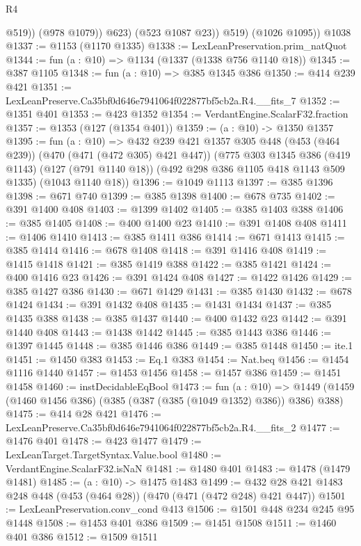 \begin{lexlean}{R4}
\begin{coremodule}
                  @519))
              (@978 @1079))
            @623)
          (@523 @1087 @23))
        @519)
      (@1026 @1095))
    @1038
@1337 := @1153 (@1170 @1335)
@1338 := LexLeanPreservation.prim_natQuot
@1344 := fun (a : @10) => @1134 (@1337 (@1338 @756 @1140 @18))
@1345 := @387 @1105
@1348 := fun (a : @10) => @385 @1345 @386
@1350 := @414 @239 @421
@1351 := LexLeanPreserve.Ca35bf0d646e7941064f022877bf5cb2a.R4.__fits_7
@1352 := @1351 @401
@1353 := @423 @1352
@1354 := VerdantEngine.ScalarF32.fraction
@1357 := @1353 (@127 (@1354 @401))
@1359 := (a : @10) -> @1350 @1357
@1395 := fun (a : @10) =>
  @432
    @239
    @421
    @1357
    @305
    @448
    (@453 (@464 @239))
    (@470 (@471 (@472 @305) @421 @447))
    (@775
      @303
      @1345
      @386
      (@419 @1143)
      (@127 (@791 @1140 @18))
      (@492 @298 @386 @1105 @418 @1143 @509 @1335)
      (@1043 @1140 @18))
@1396 := @1049 @1113
@1397 := @385 @1396
@1398 := @671 @740
@1399 := @385 @1398
@1400 := @678 @735
@1402 := @391 @1400 @408
@1403 := @1399 @1402
@1405 := @385 @1403 @388
@1406 := @385 @1405
@1408 := @400 @1400 @23
@1410 := @391 @1408 @408
@1411 := @1406 @1410
@1413 := @385 @1411 @386
@1414 := @671 @1413
@1415 := @385 @1414
@1416 := @678 @1408
@1418 := @391 @1416 @408
@1419 := @1415 @1418
@1421 := @385 @1419 @388
@1422 := @385 @1421
@1424 := @400 @1416 @23
@1426 := @391 @1424 @408
@1427 := @1422 @1426
@1429 := @385 @1427 @386
@1430 := @671 @1429
@1431 := @385 @1430
@1432 := @678 @1424
@1434 := @391 @1432 @408
@1435 := @1431 @1434
@1437 := @385 @1435 @388
@1438 := @385 @1437
@1440 := @400 @1432 @23
@1442 := @391 @1440 @408
@1443 := @1438 @1442
@1445 := @385 @1443 @386
@1446 := @1397 @1445
@1448 := @385 @1446 @386
@1449 := @385 @1448
@1450 := ite.{1}
@1451 := @1450 @383
@1453 := Eq.{1} @383
@1454 := Nat.beq
@1456 := @1454 @1116 @1440
@1457 := @1453 @1456
@1458 := @1457 @386
@1459 := @1451 @1458
@1460 := instDecidableEqBool
@1473 := fun (a : @10) =>
  @1449 (@1459 (@1460 @1456 @386) (@385 (@387 (@385 (@1049 @1352) @386)) @386) @388)
@1475 := @414 @28 @421
@1476 := LexLeanPreserve.Ca35bf0d646e7941064f022877bf5cb2a.R4.__fits_2
@1477 := @1476 @401
@1478 := @423 @1477
@1479 := LexLeanTarget.TargetSyntax.Value.bool
@1480 := VerdantEngine.ScalarF32.isNaN
@1481 := @1480 @401
@1483 := @1478 (@1479 @1481)
@1485 := (a : @10) -> @1475 @1483
@1499 := @432 @28 @421 @1483 @248 @448 (@453 (@464 @28)) (@470 (@471 (@472 @248) @421 @447))
@1501 := LexLeanPreservation.conv_cond @413
@1506 := @1501 @448 @234 @245 @95 @1448
@1508 := @1453 @401 @386
@1509 := @1451 @1508
@1511 := @1460 @401 @386
@1512 := @1509 @1511

\end{coremodule}
\end{lexlean}
